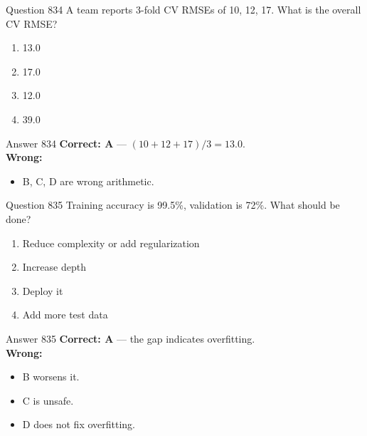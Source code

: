 \documentclass[aspectratio=169,11pt]{beamer}
\begin{document}
	\begin{frame}{Question 834}
		A team reports 3-fold CV RMSEs of 10, 12, 17. What is the overall CV RMSE?
		\begin{enumerate}[label=\Alph*.]
			\item 13.0
			\item 17.0
			\item 12.0
			\item 39.0
		\end{enumerate}
	\end{frame}
	\begin{frame}{Answer 834}
		\textbf{Correct: A} --- $(10+12+17)/3=13.0$.\\
		\vspace{0.5em}
		\textbf{Wrong:}
		\begin{itemize}
			\item B, C, D are wrong arithmetic.
		\end{itemize}
	\end{frame}
	
	\begin{frame}{Question 835}
		Training accuracy is 99.5\%, validation is 72\%. What should be done?
		\begin{enumerate}[label=\Alph*.]
			\item Reduce complexity or add regularization
			\item Increase depth
			\item Deploy it
			\item Add more test data
		\end{enumerate}
	\end{frame}
	\begin{frame}{Answer 835}
		\textbf{Correct: A} --- the gap indicates overfitting.\\
		\vspace{0.5em}
		\textbf{Wrong:}
		\begin{itemize}
			\item B worsens it.
			\item C is unsafe.
			\item D does not fix overfitting.
		\end{itemize}
	\end{frame}
	
\end{document}
